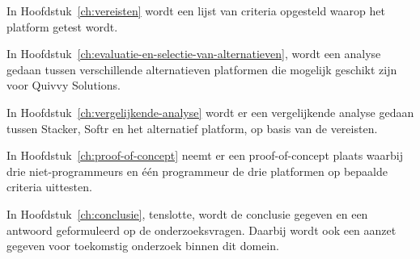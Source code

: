 In Hoofdstuk~\ref{ch:vereisten} wordt een lijst van criteria opgesteld waarop het platform getest wordt.

In Hoofdstuk~\ref{ch:evaluatie-en-selectie-van-alternatieven}, wordt een analyse gedaan tussen verschillende alternatieven platformen die mogelijk geschikt zijn voor Quivvy Solutions.

In Hoofdstuk~\ref{ch:vergelijkende-analyse} wordt er een vergelijkende analyse gedaan tussen Stacker, Softr en het alternatief platform, op basis van de vereisten.

In Hoofdstuk~\ref{ch:proof-of-concept} neemt er een proof-of-concept plaats waarbij drie niet-programmeurs en één programmeur de drie platformen op bepaalde criteria uittesten.

In Hoofdstuk~\ref{ch:conclusie}, tenslotte, wordt de conclusie gegeven en een antwoord geformuleerd op de onderzoeksvragen. Daarbij wordt ook een aanzet gegeven voor toekomstig onderzoek binnen dit domein.